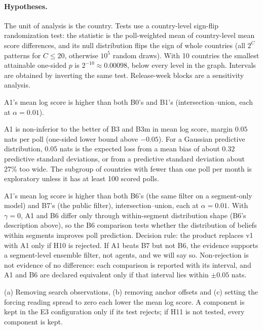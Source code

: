 \documentclass[10pt]{article}
\theoremstyle{remark}
\begin{document}
\paragraph{Hypotheses.} The unit of analysis is the country. Tests use a country-level sign-flip randomization test: the statistic is the poll-weighted mean of country-level mean score differences, and its null distribution flips the sign of whole countries (all $2^C$ patterns for $C\le20$, otherwise $10^5$ random draws). With 10 countries the smallest attainable one-sided $p$ is $2^{-10}\approx0.00098$, below every level in the graph. Intervals are obtained by inverting the same test. Release-week blocks are a sensitivity analysis.
\begin{description}
\setlength\itemsep{1pt}
\item[H8 (primary).] A1's mean log score is higher than both B0's and B1's (intersection--union, each at $\alpha=0.01$).
\item[H9 (secondary).] A1 is non-inferior to the better of B3 and B3m in mean log score, margin $0.05$ nats per poll (one-sided lower bound above $-0.05$). For a Gaussian predictive distribution, $0.05$ nats is the expected loss from a mean bias of about $0.32$ predictive standard deviations, or from a predictive standard deviation about 27\% too wide. The subgroup of countries with fewer than one poll per month is exploratory unless it has at least 100 scored polls.
\item[H10 (primary, agents and the upgrade).] A1's mean log score is higher than both B6's (the same filter on a segment-only model) and B7's (the public filter), intersection--union, each at $\alpha=0.01$. With $\gamma=0$, A1 and B6 differ only through within-segment distribution shape (B6's description above), so the B6 comparison tests whether the distribution of beliefs within segments improves poll prediction. Decision rule: the product replaces v1 with A1 only if H10 is rejected. If A1 beats B7 but not B6, the evidence supports a segment-level ensemble filter, not agents, and we will say so. Non-rejection is not evidence of no difference: each comparison is reported with its interval, and A1 and B6 are declared equivalent only if that interval lies within $\pm0.05$ nats.
\item[H11 (secondary, ablations).] (a) Removing search observations, (b) removing anchor offsets and (c) setting the forcing reading spread to zero each lower the mean log score. A component is kept in the E3 configuration only if its test rejects; if H11 is not tested, every component is kept.
\end{description}
\end{document}
